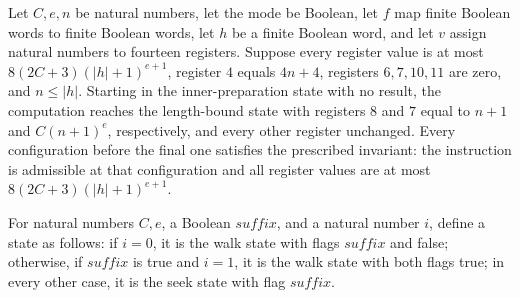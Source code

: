 \begin{lemma}
\label{Complexity.comp_inner_prepare}
\leanok
{}
Let $C,e,n$ be natural numbers, let the mode be Boolean, let $f$ map finite Boolean
words to finite Boolean words, let $h$ be a finite Boolean word, and let $v$ assign
natural numbers to fourteen registers. Suppose every register value is at most
$8(2C+3)(|h|+1)^{e+1}$, register $4$ equals $4n+4$, registers $6,7,10,11$ are zero, and
$n\le |h|$. Starting in the inner-preparation state with no result, the computation
reaches the length-bound state with registers $8$ and $7$ equal to $n+1$ and $C(n+1)^e$,
respectively, and every other register unchanged. Every configuration before the final
one satisfies the prescribed invariant: the instruction is admissible at that
configuration and all register values are at most $8(2C+3)(|h|+1)^{e+1}$.
\end{lemma}

\begin{definition}
\label{Complexity.compWalk}
\leanok
{}
For natural numbers $C,e$, a Boolean $\mathit{suffix}$, and a natural number $i$, define
a state as follows: if $i=0$, it is the walk state with flags $\mathit{suffix}$ and
false; otherwise, if $\mathit{suffix}$ is true and $i=1$, it is the walk state with both
flags true; in every other case, it is the seek state with flag $\mathit{suffix}$.
\end{definition}

